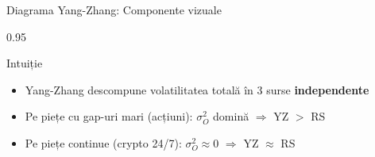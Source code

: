 \documentclass[9pt, aspectratio=169, t]{beamer}
\begin{document}
\begin{frame}[shrink=10]{Diagrama Yang-Zhang: Componente vizuale}
\begin{cminipage}{0.95\textwidth}
\begin{center}
    \end{center}
    \vspace{0.1cm}
    \begin{alertblock}{Intuiție}
    \begin{itemize}\setlength{\itemsep}{0pt}
        \item Yang-Zhang descompune volatilitatea totală în 3 surse \textbf{independente}
        \item Pe piețe cu gap-uri mari (acțiuni): $\sigma_O^2$ domină $\Rightarrow$ YZ $>$ RS
        \item Pe piețe continue (crypto 24/7): $\sigma_O^2 \approx 0$ $\Rightarrow$ YZ $\approx$ RS
    \end{itemize}
    \end{alertblock}
    \end{cminipage}
\end{frame}
\end{document}
